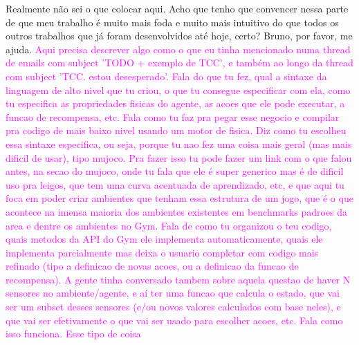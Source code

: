\documentclass[cic,tc]{iiufrgs}
\newcommand\bruno[1]{\textcolor{magenta}{#1}}
\begin{document}
Realmente não sei o que colocar aqui. Acho que tenho que convencer nessa parte de que meu trabalho é muito mais foda e muito
mais intuitivo do que todos os outros trabalhos que já foram desenvolvidos até hoje, certo?
Bruno, por favor, me ajuda.
\bruno{Aqui precisa descrever algo como o que eu tinha mencionado numa thread de emails com subject 'TODO + exemplo de TCC', e também ao longo da thread com subject 'TCC. estou desesperado'. Fala do que tu fez, qual a sintaxe da linguagem de alto nivel que tu criou, o que tu consegue especificar com ela, como tu especifica as propriedades fisicas do agente, as acoes que ele pode executar, a funcao de recompensa, etc. Fala como tu faz pra pegar esse negocio e compilar pra codigo de mais baixo nivel usando um motor de fisica. Diz como tu escolheu essa sintaxe especifica, ou seja, porque tu nao fez uma coisa mais geral (mas mais dificil de usar), tipo mujoco. Pra fazer isso tu pode fazer um link com o que falou antes, na secao do mujoco, onde tu fala que ele é super generico mas é de dificil uso pra leigos, que tem uma curva acentuada de aprendizado, etc, e que aqui tu foca em poder criar ambientes que tenham essa estrutura de um jogo, que é o que acontece na imensa maioria dos ambientes existentes em benchmarks padroes da area e dentre os ambientes no Gym. Fala de como tu organizou o teu codigo, quais metodos da API do Gym ele implementa automaticamente, quais ele implementa parcialmente mas deixa o usuario completar com codigo mais refinado (tipo a definicao de novas acoes, ou a definicao da funcao de recompensa). A gente tinha conversado tambem sobre aquela questao de haver N sensores no ambiente/agente, e aí ter uma funcao que calcula o estado, que vai ser um subset desses sensores (e/ou novos valores calculados com base neles), e que vai ser efetivamente o que vai ser usado para escolher acoes, etc. Fala como isso funciona. Esse tipo de coisa}
\end{document}
